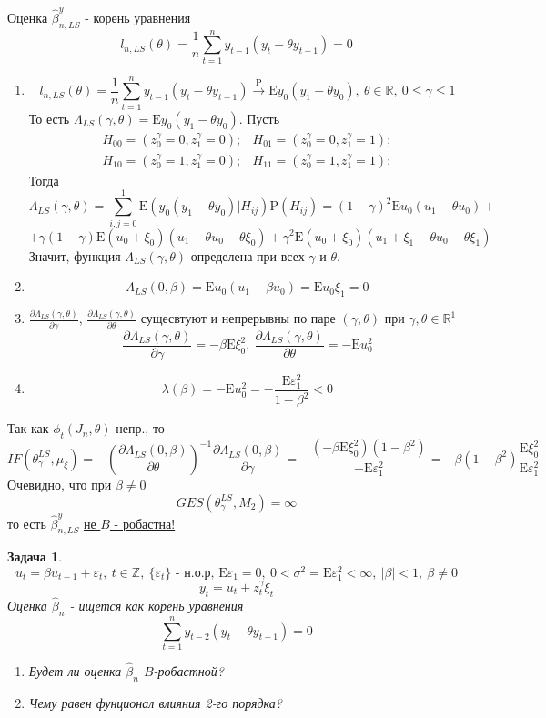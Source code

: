 \documentclass[12pt]{article}
\newtheorem*{task}{Задача}
\def\eps{ \varepsilon }
\def\R{ \mathbb{R} }
\def\Z{ \mathbb{Z} }
\def\E{ \mathrm{E} }
\def\P{ \mathrm{P} }
\begin{document}
Оценка $\widehat{\beta}^y_{n,LS}$ - корень уравнения
\[l_{n,LS}(\theta)=\frac{1}{n}\sum_{t=1}^ny_{t-1}(y_t-\theta y_{t-1})=0\]
\begin{enumerate}
    \item 
    \[l_{n,LS}(\theta)=\frac{1}{n}\sum_{t=1}^ny_{t-1}(y_t-\theta y_{t-1})\xrightarrow{\P}\E y_0(y_1-\theta y_0),\ \theta\in\R,\ 0\leq\gamma\leq1\]
    То есть $\Lambda_{LS}(\gamma,\theta)=\E y_0(y_1-\theta y_0)$.
    Пусть
    \[
    \begin{array}{cc}
        H_{00} = (z_0^\gamma=0,z_1^\gamma=0); & H_{01} = (z_0^\gamma=0,z_1^\gamma=1); \\
        H_{10} = (z_0^\gamma=1,z_1^\gamma=0); & H_{11} = (z_0^\gamma=1,z_1^\gamma=1);
    \end{array}
    \]
    Тогда
    \[\Lambda_{LS}(\gamma,\theta)=\sum_{i,j=0}^1\E(y_0(y_1-\theta y_0)|H_{ij})\P(H_{ij})=(1-\gamma)^2\E u_0(u_1-\theta u_0)+\]
    \[+\gamma(1-\gamma)\E(u_0+\xi_0)(u_1-\theta u_0-\theta\xi_0)+\gamma^2\E(u_0+\xi_0)(u_1+\xi_1-\theta u_0-\theta\xi_1)\]
    Значит, функция $\Lambda_{LS}(\gamma,\theta)$ определена при всех $\gamma$ и $\theta$.
    \item \[\Lambda_{LS}(0,\beta)=\E u_0(u_1-\beta u_0)=\E u_0\xi_1=0\]
    \item $\frac{\partial \Lambda_{LS}(\gamma,\theta)}{\partial\gamma}$, $\frac{\partial \Lambda_{LS}(\gamma,\theta)}{\partial\theta}$ 
    сущесвтуют и непрерывны по паре $(\gamma,\theta)$ при $\gamma,\theta\in\R^1$
    \[\frac{\partial \Lambda_{LS}(\gamma,\theta)}{\partial\gamma}=-\beta\E\xi_0^2,\ \frac{\partial \Lambda_{LS}(\gamma,\theta)}{\partial\theta}=-\E u_0^2\]
    \item \[\lambda(\beta)=-\E u_0^2=-\frac{\E\eps_1^2}{1-\beta^2}<0\]
\end{enumerate}
Так как $\phi_t(J_n,\theta)$ непр., то
\[IF(\theta_\gamma^{LS},\mu_\xi)=-\left(\frac{\partial\Lambda_{LS}(0,\beta)}{\partial\theta}\right)^{-1}\frac{\partial\Lambda_{LS}(0,\beta)}{\partial\gamma}=-\frac{(-\beta\E\xi_0^2)(1-\beta^2)}{-\E\eps_1^2}=-\beta(1-\beta^2)\frac{\E\xi_0^2}{\E\eps_1^2}\]
Очевидно, что при $\beta\neq0$
\[GES(\theta_\gamma^{LS}, M_2)=\infty\]
то есть $\widehat{\beta}_{n,LS}^y$ \underline{не $B$ - робастна!}

\begin{task}
    \[u_t=\beta u_{t-1}+\eps_t,\ t\in\Z,\ \{\eps_t\}\text{ - н.о.р, }\E\eps_1=0,\ 0<\sigma^2=\E\eps_1^2<\infty,\ \left\lvert \beta\right\rvert <1,\ \beta\neq0\]
    \[y_t=u_t+z_t^\gamma\xi_t\]
    Оценка $\widehat{\beta}_n$ - ищется как корень уравнения
    \[\sum_{t=1}^ny_{t-2}(y_t-\theta y_{t-1})=0\]    
    \begin{enumerate}
        \item Будет ли оценка $\widehat{\beta}_n$ $B$-робастной?
        \item Чему равен фунционал влияния 2-го порядка?
    \end{enumerate}
\end{task}
\end{document}
